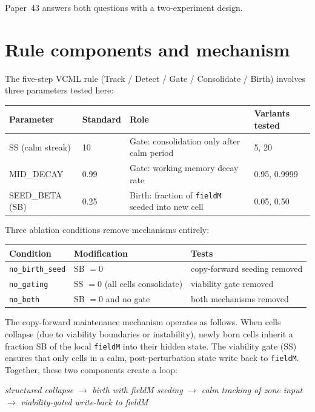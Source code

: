 \documentclass[11pt,a4paper]{article}
\begin{document}
Paper~43 answers both questions with a two-experiment design.

\section{Rule components and mechanism}

The five-step VCML rule (Track / Detect / Gate / Consolidate / Birth) involves three
parameters tested here:

\begin{center}
\begin{tabular}{llll}
\toprule
\textbf{Parameter} & \textbf{Standard} & \textbf{Role} & \textbf{Variants tested}\\
\midrule
SS (calm streak)       & 10    & Gate: consolidation only after calm period & 5, 20\\
MID\_DECAY             & 0.99  & Gate: working memory decay rate             & 0.95, 0.9999\\
SEED\_BETA (SB)        & 0.25  & Birth: fraction of \texttt{fieldM} seeded into new cell & 0.05, 0.50\\
\bottomrule
\end{tabular}
\end{center}

Three ablation conditions remove mechanisms entirely:

\begin{center}
\begin{tabular}{lll}
\toprule
\textbf{Condition} & \textbf{Modification} & \textbf{Tests}\\
\midrule
\texttt{no\_birth\_seed} & SB $= 0$  & copy-forward seeding removed\\
\texttt{no\_gating}      & SS $= 0$ (all cells consolidate) & viability gate removed\\
\texttt{no\_both}        & SB $= 0$ and no gate & both mechanisms removed\\
\bottomrule
\end{tabular}
\end{center}

The copy-forward maintenance mechanism operates as follows.  When cells collapse (due to
viability boundaries or instability), newly born cells inherit a fraction SB of the local
\texttt{fieldM} into their hidden state.  The viability gate (SS) ensures that only cells
in a calm, post-perturbation state write back to \texttt{fieldM}.  Together, these two
components create a loop:

\begin{center}
\textit{structured collapse} $\to$ \textit{birth with fieldM seeding} $\to$
\textit{calm tracking of zone input} $\to$ \textit{viability-gated write-back to fieldM}
\end{center}
\end{document}
